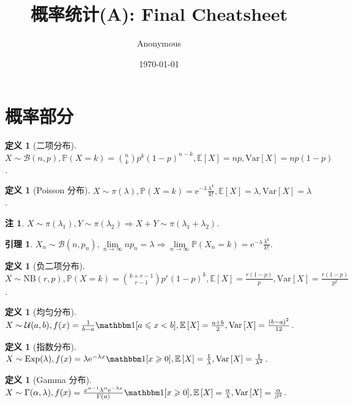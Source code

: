 \documentclass[8pt]{article}
\title{\heiti\zihao{2} 概率统计(A): Final Cheatsheet}
\author{\kaishu\zihao{-3} Anonymous}
\date{\today}
\theoremstyle{compact}
\newtheorem{lemma}[theorem]{引理}
\newtheorem{definition}[theorem]{定义}
\newtheorem{remark}[theorem]{注}
\def\le{\leqslant}
\def\ge{\geqslant}
\def\P#1{\mathbb{P}\left({#1}\right)}
\def\e{\mathrm{e}}
\def\E#1{\mathbb{E}\left[{#1}\right]}
\def\Var#1{\text{Var}\left[{#1}\right]}
\begin{document}
\fontsize{12.2}{0}

\pagestyle{plain}


\section{概率部分}
\begin{definition}[二项分布]
	$X \sim \mathcal B(n, p), \P{X = k} = \binom nk p^k (1-p)^{n-k}, \E{X} = np, \Var{X} = np(1-p)$.
\end{definition}
\begin{definition}[Poisson 分布]
	$X \sim \pi(\lambda), \P{X = k} = \e^{-\lambda}\frac{\lambda^k}{k!}, \E{X} = \lambda, \Var{X} = \lambda$.
\end{definition}
\begin{remark}
	$X \sim \pi(\lambda_1), Y \sim \pi(\lambda_2) \Rightarrow X + Y \sim \pi(\lambda_1 + \lambda_2)$.
\end{remark}
\begin{lemma}
	$X_n \sim \mathcal B(n, p_n), \lim\limits_{n \to \infty}np_n = \lambda \Rightarrow \lim\limits_{n \to \infty} \P{X_n = k} = \e^{-\lambda}\frac{\lambda^k}{k!}$.
\end{lemma}
\begin{definition}[负二项分布]
	$X \sim \text{NB}(r, p), \P{X = k} = \binom{k + r - 1}{r - 1}p^r(1-p)^{k}, \E{X} = \frac{r(1-p)}{p}, \Var{X} = \frac{r(1-p)}{p^2}$.
\end{definition}
\begin{definition}[均匀分布]
	$X \sim \mathcal U(a, b), f(x) = \frac{1}{b-a}\mathbbm 1[a \le x < b], \E{X} = \frac{a + b}{2}, \Var{X} = \frac{(b - a)^2}{12}$.
\end{definition}
\begin{definition}[指数分布]
	$X \sim \text{Exp}(\lambda), f(x) = \lambda \e^{-\lambda x} \mathbbm 1[x \ge 0], \E{X} = \frac1\lambda, \Var{X} = \frac1{\lambda^2}$.
\end{definition}
\begin{definition}[Gamma 分布]
	$X \sim \Gamma(\alpha, \lambda), f(x) = \frac{x^{\alpha - 1}\lambda^{\alpha}\e^{-\lambda x}}{\Gamma(a)}\mathbbm 1[x \ge 0], \E{X} = \frac{\alpha}{\lambda}, \Var{X} = \frac{\alpha}{\beta^2}$.
\end{definition}
\end{document}
